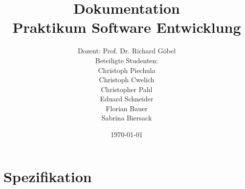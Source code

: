\documentclass[11pt,dvipsnames]{scrreprt}%
\title{Dokumentation\\
Praktikum Software Entwicklung }
\author{Dozent: Prof. Dr. Richard Göbel \\
Beteiligte Studenten: \\
Christoph Piechula \\
Christoph Cwelich \\
Christopher Pahl\\
Eduard Schneider \\
Florian Bauer \\
Sabrina Biersack \\
}
\date{\today}
\begin{document}
\graphicspath{
{./analyse/img/}
}
\maketitle

\tableofcontents

\part{Spezifikation}




\end{document}
